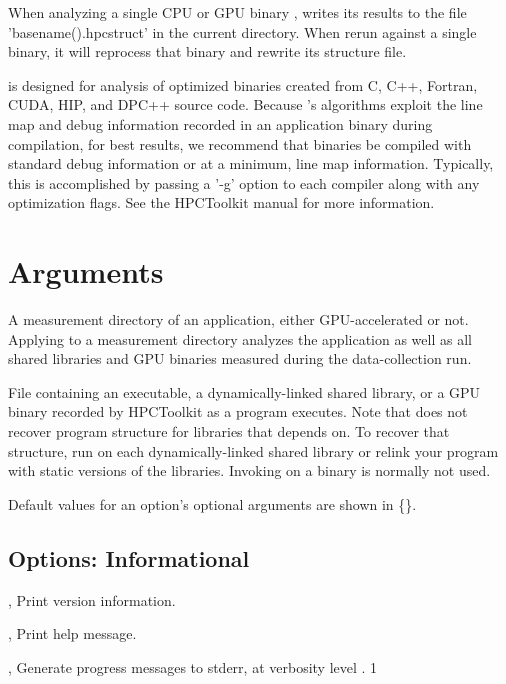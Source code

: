 \documentclass[english]{article}
\begin{document}
When analyzing a single CPU or GPU binary ,  writes its results to the file
'basename().hpcstruct' in the current directory.
When rerun against a single binary, it will reprocess that binary and rewrite
its structure file.

 is designed for analysis of optimized binaries created from
C, C++, Fortran, CUDA, HIP, and DPC++ source code. Because 's
algorithms exploit the line map and debug information recorded in an
application binary during compilation, for best results, we recommend that
binaries be compiled with standard debug information or at a minimum,
line map information. Typically, this is accomplished by passing a '-g'
option to each compiler along with any optimization flags. See the
HPCToolkit manual for more information.

\section{Arguments}

\begin{Description}
\item[\Arg{measurement directory}]
A measurement directory of an application, either GPU-accelerated or not.
Applying  to a measurement directory analyzes the application as well as
all shared libraries and GPU binaries measured during the data-collection run.

\item[\Arg{binary}] File containing an executable, a dynamically-linked shared library, or a GPU binary
recorded by HPCToolkit as a program executes.
Note that  does not recover program structure for libraries that  depends on.
To recover that structure, run  on each dynamically-linked shared library
or relink your program with static versions of the libraries.  Invoking  on a binary
is normally not used.

\end{Description}

Default values for an option's optional arguments are shown in \{\}.

\subsection{Options: Informational}

\begin{Description}

\item[\Opt{-V}, \Opt{--version}]
Print version information.

\item[\Opt{-h}, \Opt{--help}]
Print help message.

\item[\OptArg{-v}{num}, \OptArg{--verbose}{num}]
Generate progress messages to stderr, at verbosity level . {1}

\end{Description}
\end{document}
